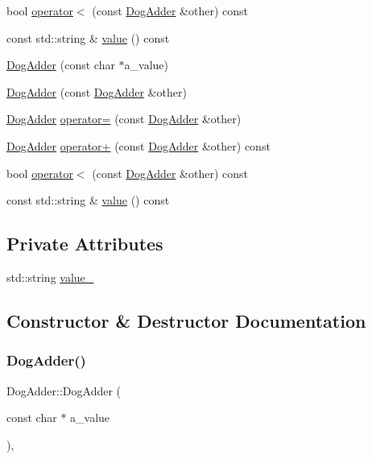 \begin{DoxyCompactItemize}
bool \mbox{\hyperlink{class_dog_adder_a6d87d3ee06c0167e7552ba83daa629e7}{operator$<$}} (const \mbox{\hyperlink{class_dog_adder}{Dog\+Adder}} \&other) const
\item 
const std\+::string \& \mbox{\hyperlink{class_dog_adder_a76bb9e42f79e9d4adacd9e48a3a3c9fb}{value}} () const
\item 
\mbox{\hyperlink{class_dog_adder_a7fd76a2078834dc255c7dd7ac7c58f32}{Dog\+Adder}} (const char $\ast$a\+\_\+value)
\item 
\mbox{\hyperlink{class_dog_adder_a35bb24b649b63f38784dcb44d55c4d94}{Dog\+Adder}} (const \mbox{\hyperlink{class_dog_adder}{Dog\+Adder}} \&other)
\item 
\mbox{\hyperlink{class_dog_adder}{Dog\+Adder}} \mbox{\hyperlink{class_dog_adder_a13bd773069c15b083f876b8afd512247}{operator=}} (const \mbox{\hyperlink{class_dog_adder}{Dog\+Adder}} \&other)
\item 
\mbox{\hyperlink{class_dog_adder}{Dog\+Adder}} \mbox{\hyperlink{class_dog_adder_ad667166cdafb4352396e910faf09a55f}{operator+}} (const \mbox{\hyperlink{class_dog_adder}{Dog\+Adder}} \&other) const
\item 
bool \mbox{\hyperlink{class_dog_adder_a6d87d3ee06c0167e7552ba83daa629e7}{operator$<$}} (const \mbox{\hyperlink{class_dog_adder}{Dog\+Adder}} \&other) const
\item 
const std\+::string \& \mbox{\hyperlink{class_dog_adder_a76bb9e42f79e9d4adacd9e48a3a3c9fb}{value}} () const
\end{DoxyCompactItemize}
\subsection*{Private Attributes}
\begin{DoxyCompactItemize}
\item 
std\+::string \mbox{\hyperlink{class_dog_adder_ac539b2207c940d290ed9b88211badce9}{value\+\_\+}}
\end{DoxyCompactItemize}


\subsection{Constructor \& Destructor Documentation}
\mbox{\label{class_dog_adder_a7fd76a2078834dc255c7dd7ac7c58f32}} 
\subsubsection{\texorpdfstring{DogAdder()}{DogAdder()}\hspace{0.1cm}{\footnotesize\ttfamily [1/6]}}
{\footnotesize\ttfamily Dog\+Adder\+::\+Dog\+Adder (\begin{DoxyParamCaption}\item[{const char $\ast$}]{a\+\_\+value }\end{DoxyParamCaption})\hspace{0.3cm}{\ttfamily [inline]}, {\ttfamily [explicit]}}


